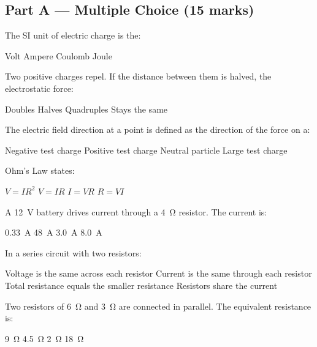 \documentclass[addpoints]{exam}
\begin{document}
\newpage
\begin{questions}

\section*{Part A --- Multiple Choice (15 marks)}
\vspace{5mm}

\question[1] The SI unit of electric charge is the:
\begin{choices}
    \choice Volt
    \choice Ampere
    \correctchoice Coulomb
    \choice Joule
\end{choices}

\question[1] Two positive charges repel. If the distance between them is halved, the
electrostatic force:
\begin{choices}
    \choice Doubles
    \choice Halves
    \correctchoice Quadruples
    \choice Stays the same
\end{choices}

\question[1] The electric field direction at a point is defined as the direction of the
force on a:
\begin{choices}
    \choice Negative test charge
    \correctchoice Positive test charge
    \choice Neutral particle
    \choice Large test charge
\end{choices}

\question[1] Ohm's Law states:
\begin{choices}
    \choice $V = IR^2$
    \correctchoice $V = IR$
    \choice $I = VR$
    \choice $R = VI$
\end{choices}

\question[1] A \SI{12}{V} battery drives current through a \SI{4}{\ohm} resistor. The
current is:
\begin{choices}
    \choice \SI{0.33}{A}
    \choice \SI{48}{A}
    \correctchoice \SI{3.0}{A}
    \choice \SI{8.0}{A}
\end{choices}

\question[1] In a series circuit with two resistors:
\begin{choices}
    \choice Voltage is the same across each resistor
    \correctchoice Current is the same through each resistor
    \choice Total resistance equals the smaller resistance
    \choice Resistors share the current
\end{choices}

\question[1] Two resistors of \SI{6}{\ohm} and \SI{3}{\ohm} are connected in parallel.
The equivalent resistance is:
\begin{choices}
    \choice \SI{9}{\ohm}
    \choice \SI{4.5}{\ohm}
    \correctchoice \SI{2}{\ohm}
    \choice \SI{18}{\ohm}
\end{choices}


\end{questions}
\end{document}
